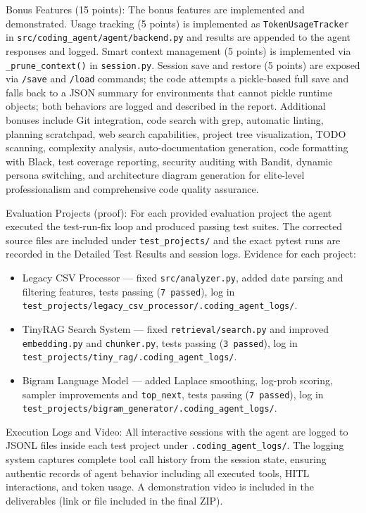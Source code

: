 \documentclass[12pt, a4paper]{article}
\begin{document}
Bonus Features (15 points): The bonus features are implemented and demonstrated. Usage tracking (5 points) is implemented as \texttt{TokenUsageTracker} in \texttt{src/coding\_agent/agent/backend.py} and results are appended to the agent responses and logged. Smart context management (5 points) is implemented via \texttt{\_prune\_context()} in \texttt{session.py}. Session save and restore (5 points) are exposed via \texttt{/save} and \texttt{/load} commands; the code attempts a pickle-based full save and falls back to a JSON summary for environments that cannot pickle runtime objects; both behaviors are logged and described in the report. Additional bonuses include Git integration, code search with grep, automatic linting, planning scratchpad, web search capabilities, project tree visualization, TODO scanning, complexity analysis, auto-documentation generation, code formatting with Black, test coverage reporting, security auditing with Bandit, dynamic persona switching, and architecture diagram generation for elite-level professionalism and comprehensive code quality assurance.

Evaluation Projects (proof): For each provided evaluation project the agent executed the test-run-fix loop and produced passing test suites. The corrected source files are included under \texttt{test\_projects/} and the exact pytest runs are recorded in the Detailed Test Results and session logs. Evidence for each project:
\begin{itemize}
  \item Legacy CSV Processor — fixed \texttt{src/analyzer.py}, added date parsing and filtering features, tests passing (\texttt{7 passed}), log in \texttt{test\_projects/legacy\_csv\_processor/.coding\_agent\_logs/}.
  \item TinyRAG Search System — fixed \texttt{retrieval/search.py} and improved \texttt{embedding.py} and \texttt{chunker.py}, tests passing (\texttt{3 passed}), log in \texttt{test\_projects/tiny\_rag/.coding\_agent\_logs/}.
  \item Bigram Language Model — added Laplace smoothing, log-prob scoring, sampler improvements and \texttt{top\_next}, tests passing (\texttt{7 passed}), log in \texttt{test\_projects/bigram\_generator/.coding\_agent\_logs/}.
\end{itemize}

Execution Logs and Video: All interactive sessions with the agent are logged to JSONL files inside each test project under \texttt{.coding\_agent\_logs/}. The logging system captures complete tool call history from the session state, ensuring authentic records of agent behavior including all executed tools, HITL interactions, and token usage. A demonstration video is included in the deliverables (link or file included in the final ZIP).
\end{document}
